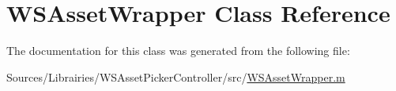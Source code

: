 \hypertarget{class_w_s_asset_wrapper}{\section{W\-S\-Asset\-Wrapper Class Reference}
\label{class_w_s_asset_wrapper}
}


The documentation for this class was generated from the following file\-:\begin{DoxyCompactItemize}
\item 
Sources/\-Librairies/\-W\-S\-Asset\-Picker\-Controller/src/\hyperlink{_w_s_asset_wrapper_8m}{W\-S\-Asset\-Wrapper.\-m}\end{DoxyCompactItemize}
